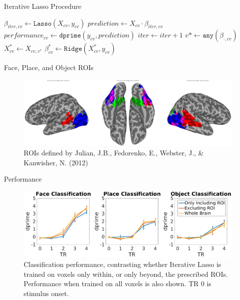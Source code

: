 \documentclass[final]{beamer}
\newlength{\introcolwid}
\begin{document}
\begin{frame}[t]
\begin{columns}[t]
\begin{column}{\introcolwid}
   		\begin{block}{Iterative Lasso Procedure}
			{\small\begin{algorithmic}
				\Repeat
						\State $\beta_{iter,cv} \gets \mathtt{Lasso}(X_{cv},y_{cv})$
						\State $prediction \gets X_{cv} \cdot \beta_{iter,cv}$
						\State $performance_{cv} \gets \mathtt{dprime}(y_{cv},prediction)$
					\EndFor
					\State $iter \gets iter+1$
					\State $v* \gets \mathtt{any}(\beta_{\cdot,cv})$
					\State $X_{cv}^* \gets X_{cv,v^*}$
					\State $\beta_{cv}^* \gets \mathtt{Ridge}(X_{cv}^*,y_{cv})$
				\EndFor
			\end{algorithmic}}
  		\end{block}
  		
		\begin{block}{Face, Place, and Object ROIs}
			\begin{figure}
				\includegraphics[width=\textwidth]{figures/ROIs.png}
				\caption{ROIs defined by Julian, J.B., Fedorenko, E., Webster, J., \& Kanwisher, N. (2012)}
			\end{figure}
		\end{block}
  				
  		\begin{block}{Performance}
			\begin{figure}
				\includegraphics[width=\textwidth]{figures/Summary_By_TR.png}
				\caption{Classification performance, contrasting whether Iterative Lasso is trained on voxels only within, or only beyond, the prescribed ROIs. Performance when trained on all voxels is also shown. TR 0 is stimulus onset.}
			\end{figure}			
  		\end{block}


\end{column}
\end{columns}
\end{frame}
\end{document}
